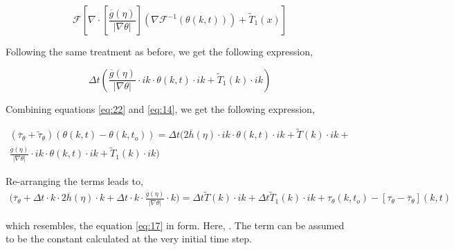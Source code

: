 \documentclass[a4paper,11pt,dvipsnames]{article}
\begin{document}
\begin{equation}
\mathcal{F} \left [ \nabla \cdot \left [ \frac{\overline{g}(\eta)}{\left | \nabla \theta \right |} \right ] \left ( \nabla \mathcal{F}^{-1} \left (\theta (k,t) \right ) \right ) + \tilde{T}_1 (x)\right ] \label{eq:21}
\end{equation}

Following the same treatment as before, we get the following expression, 

\begin{equation}
\Delta t \left ( \frac{\overline{g}(\eta)}{\left | \nabla \theta \right |} \cdot ik \cdot \theta (k,t) \cdot ik 
+ \tilde{T}_1 (k) \cdot ik \right ) \label{eq:22}
\end{equation}

Combining equations \ref{eq:22} and \ref{eq:14}, we get the following expression, 

\begin{multline}
\left ( \overline{\tau}_\theta + \tilde{\tau}_\theta \right )\left ( \theta (k,t) - \theta (k,t_o)\right ) = 
\Delta t \biggl ( 2 \overline{h} (\eta) \cdot ik \cdot \theta (k,t) \cdot ik + \tilde{T}(k) \cdot ik + \\
\frac{\overline{g}(\eta)}{\left | \nabla \theta \right |} \cdot ik \cdot \theta (k,t) \cdot ik + \tilde{T}_1 (k) \cdot ik \biggr ) \label{eq:23}
\end{multline}

Re-arranging the terms leads to, 
\begin{multline}
\biggl ( \overline{\tau}_\theta + 
\Delta t \cdot k \cdot 2 \overline{h}(\eta) \cdot k + 
\Delta t \cdot k \cdot \frac{\overline{g}(\eta)}{\left | \nabla \theta \right |} \cdot k \biggr ) = 
\Delta t \tilde{T}(k) \cdot ik + \Delta t \tilde{T}_1 (k) \cdot ik + 
\tau_\theta (k,t_o) - \left [ \tau_\theta - \overline{\tau}_\theta \right ] (k,t) \label{eq:24}
\end{multline}

which resembles, the equation \ref{eq:17} in form. 
Here, . 
The term  can be assumed to be the constant 
calculated at the very initial time step. 



\end{document}
